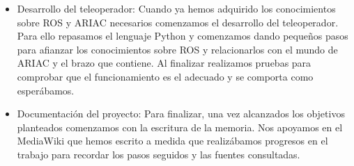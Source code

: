 \begin{itemize}
	\item Desarrollo del teleoperador:
	Cuando ya hemos adquirido los conocimientos sobre ROS y ARIAC necesarios comenzamos el desarrollo del teleoperador. Para ello repasamos el lenguaje Python y comenzamos dando pequeños pasos para afianzar los conocimientos sobre ROS y relacionarlos con el mundo de ARIAC y el brazo que contiene. Al finalizar realizamos pruebas para comprobar que el funcionamiento es el adecuado y se comporta como esperábamos.
	
	\item Documentación del proyecto:
	Para finalizar, una vez alcanzados los objetivos planteados comenzamos con la escritura de la memoria. Nos apoyamos en el MediaWiki que hemos escrito a medida que realizábamos progresos en el trabajo para recordar los pasos seguidos y las fuentes consultadas.
	
\end{itemize}




